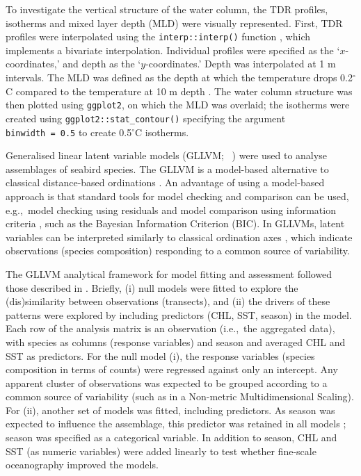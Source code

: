 \documentclass[preprint, 3p, authoryear]{elsarticle} %
\begin{document}
To investigate the vertical structure of the water column, the TDR profiles, isotherms and mixed layer depth (MLD) were visually represented. First, TDR profiles were interpolated using the \texttt{interp::interp()} function \citep{interp}, which implements a bivariate interpolation. Individual profiles were specified as the `\(x\)-coordinates,' and depth as the `\(y\)-coordinates.' Depth was interpolated at 1 m intervals. The MLD was defined as the depth at which the temperature drops 0.2\(^{\circ}\)C compared to the temperature at 10 m depth \citep{deboyermontegut2004}. The water column structure was then plotted using \texttt{ggplot2}, on which the MLD was overlaid; the isotherms were created using \texttt{ggplot2::stat\_contour()} specifying the argument \texttt{binwidth\ =\ 0.5} to create 0.5\(^{\circ}\)C isotherms.

Generalised linear latent variable models (GLLVM; ~\citealp{niku2019}) were used to analyse assemblages of seabird species. The GLLVM is a model-based alternative to classical distance-based ordinations \citep{warton2012, warton2015tree}. An advantage of using a model-based approach is that standard tools for model checking and comparison can be used, e.g.,~model checking using residuals and model comparison using information criteria \citep{niku2019}, such as the Bayesian Information Criterion (BIC). In GLLVMs, latent variables can be interpreted similarly to classical ordination axes \citep{niku2019}, which indicate observations (species composition) responding to a common source of variability.

The GLLVM analytical framework for model fitting and assessment followed those described in \citet{daudt2025}. Briefly, (i) null models were fitted to explore the (dis)similarity between observations (transects), and (ii) the drivers of these patterns were explored by including predictors (CHL, SST, season) in the model. Each row of the analysis matrix is an observation (i.e.,~the aggregated data), with species as columns (response variables) and season and averaged CHL and SST as predictors. For the null model (i), the response variables (species composition in terms of counts) were regressed against only an intercept. Any apparent cluster of observations was expected to be grouped according to a common source of variability (such as in a Non-metric Multidimensional Scaling). For (ii), another set of models was fitted, including predictors. As season was expected to influence the assemblage, this predictor was retained in all models \citep{tredennick2021}; season was specified as a categorical variable. In addition to season, CHL and SST (as numeric variables) were added linearly to test whether fine-scale oceanography improved the models.
\end{document}
